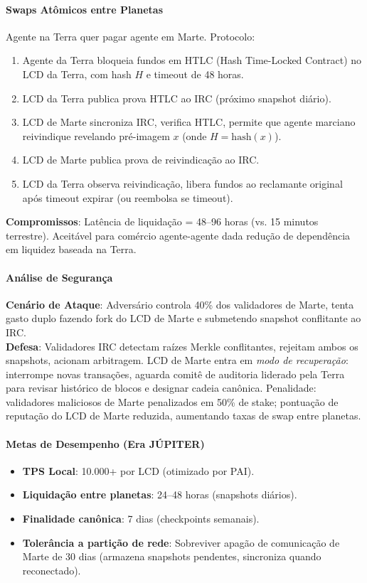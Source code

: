 \documentclass[11pt]{article}
\begin{document}
\paragraph{Swaps Atômicos entre Planetas}
Agente na Terra quer pagar agente em Marte. Protocolo:
\begin{enumerate}[noitemsep]
  \item Agente da Terra bloqueia fundos em HTLC (Hash Time-Locked Contract) no LCD da Terra, com hash $H$ e timeout de 48 horas.
  \item LCD da Terra publica prova HTLC ao IRC (próximo snapshot diário).
  \item LCD de Marte sincroniza IRC, verifica HTLC, permite que agente marciano reivindique revelando pré-imagem $x$ (onde $H = \text{hash}(x)$).
  \item LCD de Marte publica prova de reivindicação ao IRC.
  \item LCD da Terra observa reivindicação, libera fundos ao reclamante original após timeout expirar (ou reembolsa se timeout).
\end{enumerate}
\textbf{Compromissos}: Latência de liquidação = 48--96 horas (vs. 15 minutos terrestre). Aceitável para comércio agente-agente dada redução de dependência em liquidez baseada na Terra.

\paragraph{Análise de Segurança}
\textbf{Cenário de Ataque}: Adversário controla 40\% dos validadores de Marte, tenta gasto duplo fazendo fork do LCD de Marte e submetendo snapshot conflitante ao IRC.\\
\textbf{Defesa}: Validadores IRC detectam raízes Merkle conflitantes, rejeitam ambos os snapshots, acionam arbitragem. LCD de Marte entra em \emph{modo de recuperação}: interrompe novas transações, aguarda comitê de auditoria liderado pela Terra para revisar histórico de blocos e designar cadeia canônica. Penalidade: validadores maliciosos de Marte penalizados em 50\% de stake; pontuação de reputação do LCD de Marte reduzida, aumentando taxas de swap entre planetas.

\paragraph{Metas de Desempenho (Era JÚPITER)}
\begin{itemize}[noitemsep]
  \item \textbf{TPS Local}: 10.000+ por LCD (otimizado por PAI).
  \item \textbf{Liquidação entre planetas}: 24--48 horas (snapshots diários).
  \item \textbf{Finalidade canônica}: 7 dias (checkpoints semanais).
  \item \textbf{Tolerância a partição de rede}: Sobreviver apagão de comunicação de Marte de 30 dias (armazena snapshots pendentes, sincroniza quando reconectado).
\end{itemize}
\end{document}
